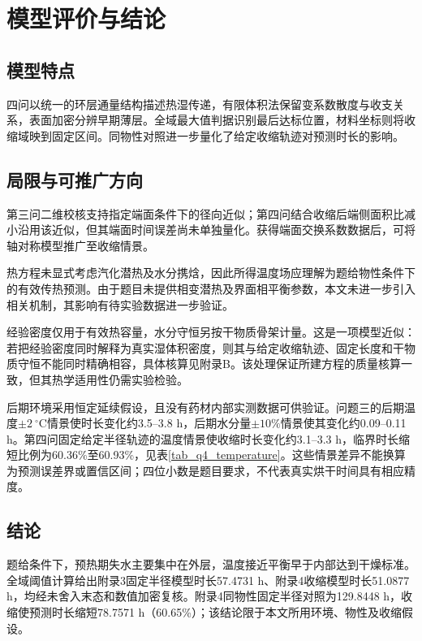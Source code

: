 \section{模型评价与结论}\label{sec_evaluation}
\subsection{模型特点}
四问以统一的环层通量结构描述热湿传递，有限体积法保留变系数散度与收支关系，表面加密分辨早期薄层。全域最大值判据识别最后达标位置，材料坐标则将收缩域映到固定区间。同物性对照进一步量化了给定收缩轨迹对预测时长的影响。

\subsection{局限与可推广方向}
第三问二维校核支持指定端面条件下的径向近似；第四问结合收缩后端侧面积比减小沿用该近似，但其端面时间误差尚未单独量化。获得端面交换系数数据后，可将轴对称模型推广至收缩情景。

热方程未显式考虑汽化潜热及水分携焓，因此所得温度场应理解为题给物性条件下的有效传热预测。由于题目未提供相变潜热及界面相平衡参数，本文未进一步引入相关机制，其影响有待实验数据进一步验证。

经验密度仅用于有效热容量，水分守恒另按干物质骨架计量。这是一项模型近似：若把经验密度同时解释为真实湿体积密度，则其与给定收缩轨迹、固定长度和干物质守恒不能同时精确相容，具体核算见附录B。该处理保证所建方程的质量核算一致，但其热学适用性仍需实验检验。

后期环境采用恒定延续假设，且没有药材内部实测数据可供验证。问题三的后期温度$\pm2\ ^\circ$C情景使时长变化约3.5--3.8 h，后期水分量$\pm10\%$情景使其变化约0.09--0.11 h。第四问固定给定半径轨迹的温度情景使收缩时长变化约3.1--3.3 h，临界时长缩短比例为60.36\%至60.93\%，见表\ref{tab_q4_temperature}。这些情景差异不能换算为预测误差界或置信区间；四位小数是题目要求，不代表真实烘干时间具有相应精度。

\subsection{结论}
题给条件下，预热期失水主要集中在外层，温度接近平衡早于内部达到干燥标准。全域阈值计算给出附录3固定半径模型时长57.4731 h、附录4收缩模型时长51.0877 h，均经未舍入末态和数值加密复核。附录4同物性固定半径对照为129.8448 h，收缩使预测时长缩短78.7571 h（60.65\%）；该结论限于本文所用环境、物性及收缩假设。
